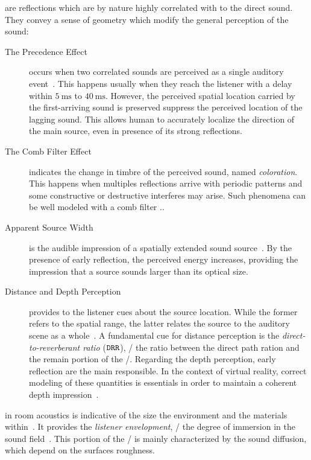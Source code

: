  are reflections which are by nature highly correlated with to the direct sound.
They convey a sense of geometry which modify the general perception of the sound:
\begin{description}
    \item[The Precedence Effect] occurs when two correlated sounds are perceived as a single auditory event~.
    This happens usually when they reach the listener with a delay within $\SI{5}{\ms}$ to $\SI{40}{\ms}$.
    However, the perceived spatial location carried by the first-arriving sound is preserved suppress the perceived location of the lagging sound.
    This allows human to accurately localize the direction of the main source, even in presence of its strong reflections.
    \item[The Comb Filter Effect] indicates the change in timbre of the perceived sound, named \textit{coloration}.
    This happens when multiples reflections arrive with periodic patterns and some constructive or destructive interferes may arise.
    Such phenomena can be well modeled with a comb filter ..
    \item[Apparent Source Width] is the audible impression of a spatially extended sound source~.
    By the presence of early reflection, the perceived energy increases, providing the impression that a source sounds larger than its optical size.
    \item[Distance and Depth Perception] provides to the listener cues about the source location.
    While the former refers to the spatial range, the latter relates the source to the auditory scene as a whole~.
    A fundamental cue for distance perception is the \textit{direct-to-reverberant ratio} ($\mathtt{DRR}$),
    \ie/ the ratio between the direct path ration and the remain portion of the \RIR/.
    Regarding the depth perception, early reflection are the main responsible.
    In the context of virtual reality, correct modeling of these quantities is essentials in order to maintain a coherent depth impression~.
\end{description}

 in room acoustics is indicative of the size the environment and the materials within~.
It provides the \textit{listener envelopment}, \ie/ the degree of immersion in the sound field~.
This portion of the \RIR/ is mainly characterized by the sound diffusion, which depend on the surfaces roughness.

